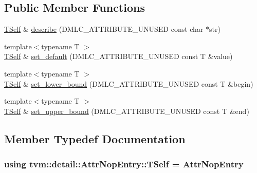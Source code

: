 \subsection*{Public Member Functions}
\begin{DoxyCompactItemize}
\item 
\hyperlink{structtvm_1_1detail_1_1AttrNopEntry_adab25bf47ec60e73d1e02c3cef2f6898}{T\+Self} \& \hyperlink{structtvm_1_1detail_1_1AttrNopEntry_a9bd1f913549c1b4376c0137f4101b791}{describe} (D\+M\+L\+C\+\_\+\+A\+T\+T\+R\+I\+B\+U\+T\+E\+\_\+\+U\+N\+U\+S\+ED const char $\ast$str)
\item 
{\footnotesize template$<$typename T $>$ }\\\hyperlink{structtvm_1_1detail_1_1AttrNopEntry_adab25bf47ec60e73d1e02c3cef2f6898}{T\+Self} \& \hyperlink{structtvm_1_1detail_1_1AttrNopEntry_a370e92bafbada9ba805a52e72881f98b}{set\+\_\+default} (D\+M\+L\+C\+\_\+\+A\+T\+T\+R\+I\+B\+U\+T\+E\+\_\+\+U\+N\+U\+S\+ED const T \&value)
\item 
{\footnotesize template$<$typename T $>$ }\\\hyperlink{structtvm_1_1detail_1_1AttrNopEntry_adab25bf47ec60e73d1e02c3cef2f6898}{T\+Self} \& \hyperlink{structtvm_1_1detail_1_1AttrNopEntry_a36da34fc54009d63283d07e9d41657f7}{set\+\_\+lower\+\_\+bound} (D\+M\+L\+C\+\_\+\+A\+T\+T\+R\+I\+B\+U\+T\+E\+\_\+\+U\+N\+U\+S\+ED const T \&begin)
\item 
{\footnotesize template$<$typename T $>$ }\\\hyperlink{structtvm_1_1detail_1_1AttrNopEntry_adab25bf47ec60e73d1e02c3cef2f6898}{T\+Self} \& \hyperlink{structtvm_1_1detail_1_1AttrNopEntry_add2843b725ee43be26672a8d2d641cce}{set\+\_\+upper\+\_\+bound} (D\+M\+L\+C\+\_\+\+A\+T\+T\+R\+I\+B\+U\+T\+E\+\_\+\+U\+N\+U\+S\+ED const T \&end)
\end{DoxyCompactItemize}


\subsection{Member Typedef Documentation}
\subsubsection[{\texorpdfstring{T\+Self}{TSelf}}]{\setlength{\rightskip}{0pt plus 5cm}using {\bf tvm\+::detail\+::\+Attr\+Nop\+Entry\+::\+T\+Self} =  {\bf Attr\+Nop\+Entry}}\hypertarget{structtvm_1_1detail_1_1AttrNopEntry_adab25bf47ec60e73d1e02c3cef2f6898}{}\label{structtvm_1_1detail_1_1AttrNopEntry_adab25bf47ec60e73d1e02c3cef2f6898}


